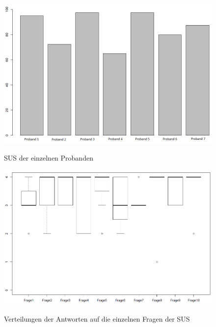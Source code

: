 \begin{figure}[h]
	\begin{center}
		\includegraphics[scale=0.5]{Resources/Evaluation/sus_allTotals.png}
		\label{sus_all}
		\caption{SUS der einzelnen Probanden}	
	\end{center}
\end{figure}

\begin{figure}[H]
	\begin{center}
		\includegraphics[scale=0.5]{Resources/Evaluation/sus_allQuestionsBox.png}
		\label{sus_questionsBox}
		\caption{Verteilungen der Antworten auf die einzelnen Fragen der SUS}	
	\end{center}
\end{figure}

